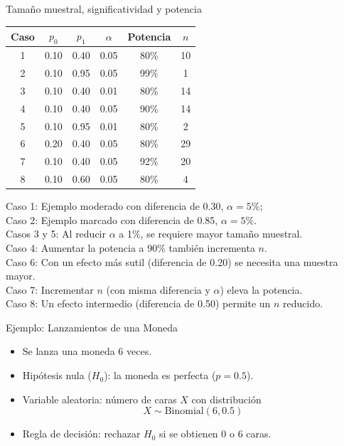 ﻿\documentclass{beamer}
\begin{document}
\begin{frame}{Tamaño muestral, significatividad y potencia}
\begin{center}
\begin{tabular}{cccccc}
\toprule
Caso & $p_0$ & $p_1$ & $\alpha$ & Potencia & $n$ \\
\midrule
1 & 0.10 & 0.40 & 0.05 & 80\% & 10 \\
2 & 0.10 & 0.95 & 0.05 & 99\% & 1 \\
3 & 0.10 & 0.40 & 0.01 & 80\% & 14 \\
4 & 0.10 & 0.40 & 0.05 & 90\% & 14 \\
5 & 0.10 & 0.95 & 0.01 & 80\% & 2 \\
6 & 0.20 & 0.40 & 0.05 & 80\% & 29 \\
7 & 0.10 & 0.40 & 0.05 & 92\% & 20 \\
8 & 0.10 & 0.60 & 0.05 & 80\% & 4 \\
\bottomrule
\end{tabular}
\end{center}
\vspace{0.3cm}
\footnotesize
Caso 1: Ejemplo moderado con diferencia de 0.30, $\alpha=5\%$; \\
Caso 2: Ejemplo marcado con diferencia de 0.85, $\alpha=5\%$. \\
Casos 3 y 5: Al reducir $\alpha$ a 1\%, se requiere mayor tamaño muestral. \\
Caso 4: Aumentar la potencia a 90\% también incrementa $n$. \\
Caso 6: Con un efecto más sutil (diferencia de 0.20) se necesita una muestra mayor. \\
Caso 7: Incrementar $n$ (con misma diferencia y $\alpha$) eleva la potencia. \\
Caso 8: Un efecto intermedio (diferencia de 0.50) permite un $n$ reducido.
\end{frame}

\begin{frame}{Ejemplo: Lanzamientos de una Moneda}
    \begin{itemize}
        \item Se lanza una moneda 6 veces.
        \item Hipótesis nula (\(H_0\)): la moneda es perfecta (\(p=0.5\)).
        \item Variable aleatoria: número de caras \(X\) con distribución 
        \[
        X \sim \text{Binomial}(6,0.5)
        \]
        \item Regla de decisión: rechazar \(H_0\) si se obtienen 0 o 6 caras.
    \end{itemize}
\end{frame}
\end{document}
